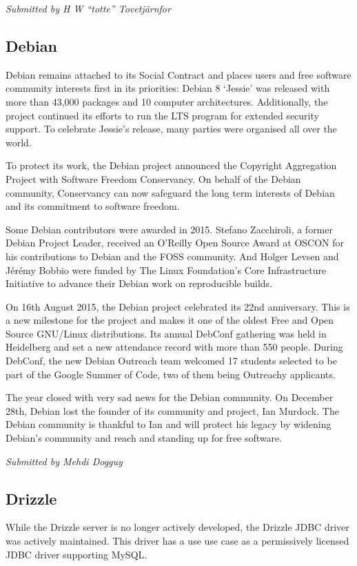 \documentclass[letterpaper]{report}
\begin{document}
{\em Submitted by H W ``totte'' Tovetjärnfor}

\subsection{Debian}

Debian remains attached to its Social Contract and places users and free
software community interests first in its priorities: Debian 8 `Jessie'
was released with more than 43,000 packages and 10 computer architectures.
Additionally, the project continued its efforts to run the LTS program for
extended security support.  To celebrate Jessie's release, many parties
were organised all over the world.

To protect its work, the Debian project announced the Copyright
Aggregation Project with Software Freedom Conservancy.  On behalf of the
Debian community, Conservancy can now safeguard the long term interests of
Debian and its commitment to software freedom.

Some Debian contributors were awarded in 2015.  Stefano Zacchiroli, a
former Debian Project Leader, received an O'Reilly Open Source Award at
OSCON for his contributions to Debian and the FOSS community.  And Holger
Levsen and Jérémy Bobbio were funded by The Linux Foundation's Core
Infrastructure Initiative to advance their Debian work on reproducible
builds.

On 16th August 2015, the Debian project celebrated its 22nd anniversary.
This is a new milestone for the project and makes it one of the oldest
Free and Open Source GNU/Linux distributions.  Its annual DebConf
gathering was held in Heidelberg and set a new attendance record with more
than 550 people.  During DebConf, the new Debian Outreach team welcomed 17
students selected to be part of the Google Summer of Code, two of them
being Outreachy applicants.

The year closed with very sad news for the Debian community.  On December
28th, Debian lost the founder of its community and project, Ian Murdock.
The Debian community is thankful to Ian and will protect his legacy by
widening Debian's community and reach and standing up for free software.

{\em Submitted by Mehdi Dogguy}

\subsection{Drizzle}

While the Drizzle server is no longer actively developed, the Drizzle JDBC
driver was actively maintained.  This driver has a use use case as a
permissively licensed JDBC driver supporting MySQL.
\end{document}
